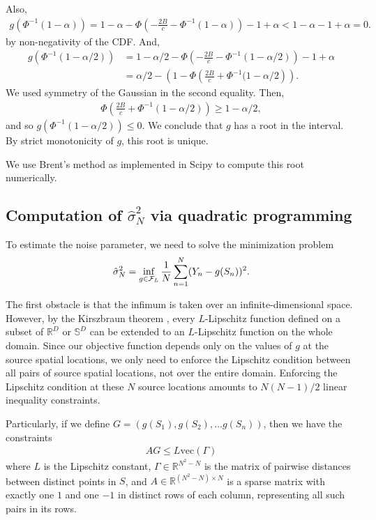 Also,
\begin{align}
    g(\Phi^{-1}(1-\alpha)) = 1- \alpha - \Phi\left(-\frac{2B}{c}-\Phi^{-1}(1-\alpha)\right) - 1 + \alpha < 1-\alpha -1 + \alpha =0.
\end{align}
by non-negativity of the CDF. And, 
\begin{align}
    g(\Phi^{-1}(1-\alpha/2)) &= 1- \alpha/2 - \Phi\left(-\frac{2B}{c}-\Phi^{-1}(1-\alpha/2)\right) - 1 + \alpha \\
    &= \alpha/2 - \left(1-  \Phi\left(\frac{2B}{c}+\Phi^{-1}(1-\alpha/2\right)\right). 
\end{align}
We used symmetry of the Gaussian in the second equality. Then,
\begin{align}
\Phi\left(\frac{2B}{c}+\Phi^{-1}(1-\alpha/2)\right) \geq 1-\alpha/2,
\end{align}
and so $g(\Phi^{-1}(1-\alpha/2)) \leq 0$. We conclude that $g$ has a root in the interval. By strict monotonicity of $g$, this root is unique. 

We use Brent's method \citep{brent_algorithm_1971} as implemented in Scipy \citep{2020SciPy-NMeth} to compute this root numerically.

\subsection{Computation of $\hat{\sigma}^2_N$ via quadratic programming}\label{app:computation-variance-estimator}
To estimate the noise parameter, we need to solve the minimization problem
\begin{align}
      \hat{\sigma}^2_N = \inf_{g \in \mathcal{F}_L} \frac{1}{N}\sum_{n=1}^N (Y_n - g(S_n))^2.
\end{align}

The first obstacle is that the infimum is taken over an infinite-dimensional space. However, 
by the Kirszbraun theorem \citep{Kirszbraun1934berDZ,Valentine1945}, every $L$-Lipschitz function 
defined on a subset of $\mathbb{R}^D$ or $\mathbb{S}^D$ can be extended to an $L$-Lipschitz function 
on the whole domain. Since our objective function depends only on the values of $g$ at the source 
spatial locations, we only need to enforce the Lipschitz condition between all pairs of source 
spatial locations, not over the entire domain. Enforcing the Lipschitz condition at these $N$ 
source locations amounts to $N(N-1)/2$ linear inequality constraints. 

Particularly, if we define $G = (g(S_1), g(S_2), \dots g(S_n))$, then we have the constraints
\begin{align}
    AG \leq L \mathrm{vec}(\Gamma)
\end{align}
where $L$ is the Lipschitz constant, 
$\Gamma \in \mathbb{R}^{N^2 - N}$ is the matrix of pairwise distances between distinct points in $S$, 
and $A \in \mathbb{R}^{(N^2 - N)\times N}$ is a sparse matrix with exactly one $1$ and one $-1$ in 
distinct rows of each column, representing all such pairs in its rows.

